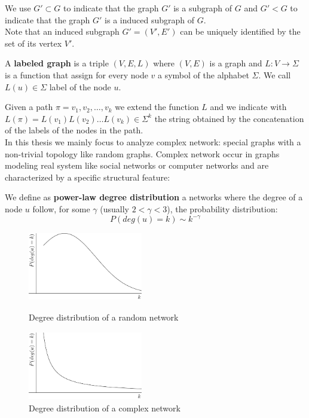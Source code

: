 We use $G' \subset G$ to indicate that the graph $G'$ is a subgraph of $G$ and $G' < G$ to indicate that the graph $G'$ is a induced subgraph of $G$.\\

Note that an induced subgraph $G' = (V', E')$ can be uniquely identified by the set of its vertex $V'$.

\begin{definizione}\label{def:labeledgraph}
	A \textbf{labeled graph} is a triple $(V,E,L)$ where $(V,E)$ is a graph and $L : V \rightarrow \Sigma$
	is a function that assign for every node $v$ a symbol of the alphabet $\Sigma$. We call $L(u) \in \Sigma$ label of the node $u$.
\end{definizione}

Given a path $\pi = v_{1}, v_{2}, \ldots, v_{k}$ we extend the function $L$ and we indicate with $L(\pi) = L(v_{1}) L(v_{2}) \ldots L(v_{k}) \in \Sigma^{k}$ the string obtained by the concatenation of the labels of the nodes in the path.\\

In this thesis we mainly focus to analyze complex network: special graphs with a non-trivial topology like random graphs. Complex network occur in graphs modeling real system like social networks or computer networks and are characterized by a specific structural feature:

\begin{definizione}\label{def:power-law-graph}
	We define as \textbf{power-law degree distribution} a networks where the degree of a node $u$ follow, for some $\gamma$ (usually $2 < \gamma < 3$), the probability distribution:
	\begin{equation}
		P(deg(u) = k) \sim k^{-\gamma}  
	\end{equation}
\end{definizione}

\begin{figure}[h]
	\centering
	\begin{minipage}[t]{.45\textwidth}
		\centering
		\includegraphics[width=5cm,height=3cm]{figure/figure-1-1}
		\caption{Degree distribution of a random network}
	\end{minipage}\hfill
	\begin{minipage}[t]{.45\textwidth}
		\centering 
		\includegraphics[width=5cm,height=3cm]{figure/figure-1-2}
		\caption{Degree distribution of a complex network}
	\end{minipage}
\end{figure}

